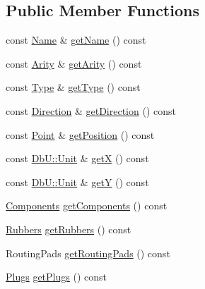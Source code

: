 \subsection*{Public Member Functions}
\begin{DoxyCompactItemize}
\item 
const \mbox{\hyperlink{classHurricane_1_1Name}{Name}} \& \mbox{\hyperlink{classHurricane_1_1Net_aeba73ca641db371dde29baf348b58bba}{get\+Name}} () const
\item 
const \mbox{\hyperlink{classHurricane_1_1Net_a3a242d929e0c733f90f3f69be8cc427b}{Arity}} \& \mbox{\hyperlink{classHurricane_1_1Net_a78de2202fcf4f16024b4460ebb7dc907}{get\+Arity}} () const
\item 
const \mbox{\hyperlink{classHurricane_1_1Net_1_1Type}{Type}} \& \mbox{\hyperlink{classHurricane_1_1Net_a0fa61dc0ccb67f384f03b35f83d391e7}{get\+Type}} () const
\item 
const \mbox{\hyperlink{classHurricane_1_1Net_1_1Direction}{Direction}} \& \mbox{\hyperlink{classHurricane_1_1Net_aa84245d734dfaa572660a1a2c1bfc56e}{get\+Direction}} () const
\item 
const \mbox{\hyperlink{classHurricane_1_1Point}{Point}} \& \mbox{\hyperlink{classHurricane_1_1Net_abcfdec9c953d228845fdb9d75e8173cc}{get\+Position}} () const
\item 
const \mbox{\hyperlink{group__DbUGroup_ga4fbfa3e8c89347af76c9628ea06c4146}{Db\+U\+::\+Unit}} \& \mbox{\hyperlink{classHurricane_1_1Net_a1f8f4c4632614b84a1227a1da8310428}{getX}} () const
\item 
const \mbox{\hyperlink{group__DbUGroup_ga4fbfa3e8c89347af76c9628ea06c4146}{Db\+U\+::\+Unit}} \& \mbox{\hyperlink{classHurricane_1_1Net_aa97899b408aa47ec22792b5c6d6e9216}{getY}} () const
\item 
\mbox{\hyperlink{namespaceHurricane_a7d26d99aeb5dd6d70d51bd35d2473e72}{Components}} \mbox{\hyperlink{classHurricane_1_1Net_a1e2d7ef9bab15694870a605e514f26e8}{get\+Components}} () const
\item 
\mbox{\hyperlink{namespaceHurricane_af8923abd57508cc44931a00d61b564ad}{Rubbers}} \mbox{\hyperlink{classHurricane_1_1Net_a6ddbe2697a7fd7a7cd359f97b2ad0223}{get\+Rubbers}} () const
\item 
Routing\+Pads \mbox{\hyperlink{classHurricane_1_1Net_a1078d55acf3efa0b3c23cd345cae87fa}{get\+Routing\+Pads}} () const
\item 
\mbox{\hyperlink{namespaceHurricane_ac8335d2057483ee7a935c15a9460c64f}{Plugs}} \mbox{\hyperlink{classHurricane_1_1Net_a88322672c105405a61a78022359178aa}{get\+Plugs}} () const

\end{DoxyCompactItemize}
